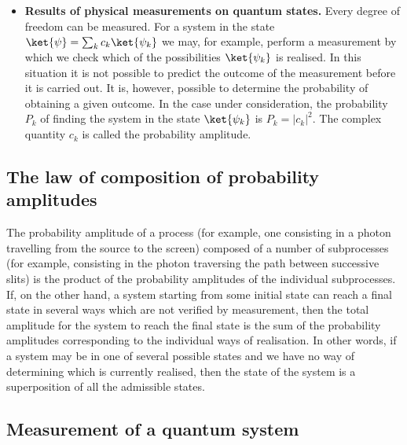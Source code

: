 \begin{itemize}
    \item \textbf{Results of physical measurements on quantum states.} Every degree of freedom can be measured. For a system in the state $\ket{\psi} = \sum_{k}c_{k}\ket{\psi_{k}}$ we may, for example, perform a measurement by which we check which of the possibilities $\ket{\psi_{k}}$ is realised. In this situation it is not possible to predict the outcome of the measurement before it is carried out. It is, however, possible to determine the probability of obtaining a given outcome. In the case under consideration, the probability $P_{k}$ of finding the system in the state $\ket{\psi_{k}}$ is $P_{k} = |c_{k}|^{2}$. The complex quantity $c_{k}$ is called the probability amplitude.
\end{itemize}

\subsection{The law of composition of probability amplitudes}

The probability amplitude of a process (for example, one consisting in a photon travelling from the source to the screen) composed of a number of subprocesses (for example, consisting in the photon traversing the path between successive slits) is the product of the probability amplitudes of the individual subprocesses. If, on the other hand, a system starting from some initial state can reach a final state in several ways which are not verified by measurement, then the total amplitude for the system to reach the final state is the sum of the probability amplitudes corresponding to the individual ways of realisation. In other words, if a system may be in one of several possible states and we have no way of determining which is currently realised, then the state of the system is a superposition of all the admissible states.

\subsection{Measurement of a quantum system}

